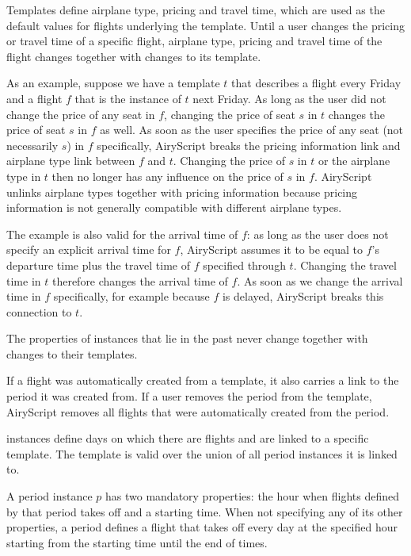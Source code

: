 \begin{description}
    Templates define airplane type, pricing and travel time, which are
    used as the default values for flights underlying the template. Until a user
    changes the pricing or travel time of a specific flight, airplane type,
    pricing and travel time of the flight changes together with changes to its
    template.
    
    As an example, suppose we have a template $t$ that describes a flight every
    Friday and a flight $f$ that is the instance of $t$ next Friday. As long as
    the user did not change the price of any seat in $f$, changing the price of
    seat $s$ in $t$ changes the price of seat $s$ in $f$ as well. As soon as the
    user specifies the price of any seat (not necessarily $s$) in $f$
    specifically, AiryScript breaks the pricing information link and airplane
    type link between $f$ and $t$. Changing the price of $s$ in $t$ or the
    airplane type in $t$ then no longer has any influence on the price of $s$ in
    $f$. AiryScript unlinks airplane types together with pricing information
    because pricing information is not generally compatible with different
    airplane types.
    
    The example is also valid for the arrival time of $f$: as long as the user
    does not specify an explicit arrival time  for $f$, AiryScript
    assumes it to be equal to $f$’s departure time  plus the travel
    time of $f$ specified through $t$. Changing the travel time in $t$ therefore
    changes the arrival time of $f$. As soon as we change the arrival time in
    $f$ specifically, for example because $f$ is delayed, AiryScript breaks this
    connection to $t$.
    
    The properties of  instances that lie in the past never change
    together with changes to their templates.

    If a flight was automatically created from a template, it also carries a
    link to the period it was created from. If a user removes the period from
    the template, AiryScript removes all flights that were automatically created
    from the period.

  \item[\dbf{Period}] instances define days on which there are flights and are
    linked to a specific template. The template is valid over the union of all
    period instances it is linked to.

    A period instance $p$ has two mandatory properties: the hour when flights
    defined by that period takes off and a starting time. When not specifying
    any of its other properties, a period defines a flight that takes off every
    day at the specified hour starting from the starting time until the end of
    times.


\end{description}

